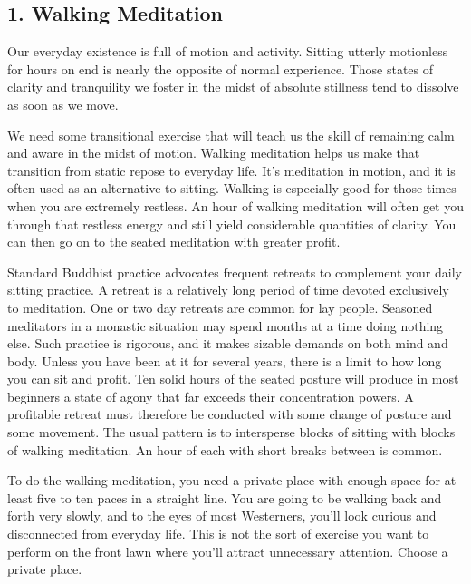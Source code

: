 \subsection*{1. Walking Meditation}

Our everyday existence is full of motion and activity.  Sitting utterly
motionless for hours on end is nearly the opposite of normal experience. Those
states of clarity and tranquility we foster in the midst of absolute stillness
tend to dissolve as soon as we move.

We need some transitional exercise that will teach us the skill of remaining
calm and aware in the midst of motion. Walking meditation helps us make that
transition from static repose to everyday life. It's meditation in motion, and
it is often used as an alternative to sitting. Walking is especially good for
those times when you are extremely restless. An hour of walking meditation will
often get you through that restless energy and still yield considerable
quantities of clarity. You can then go on to the seated meditation with greater
profit.

Standard Buddhist practice advocates frequent retreats to complement your daily
sitting practice. A retreat is a relatively long period of time devoted
exclusively to meditation. One or two day retreats are common for lay people.
Seasoned meditators in a monastic situation may spend months at a time doing
nothing else. Such practice is rigorous, and it makes sizable demands on both
mind and body. Unless you have been at it for several years, there is a limit to
how long you can sit and profit. Ten solid hours of the seated posture will
produce in most beginners a state of agony that far exceeds their concentration
powers. A profitable retreat must therefore be conducted with some change of
posture and some movement. The usual pattern is to intersperse blocks of sitting
with blocks of walking meditation. An hour of each with short breaks between is
common.

To do the walking meditation, you need a private place with enough space for at
least five to ten paces in a straight line. You are going to be walking back and
forth very slowly, and to the eyes of most Westerners, you'll look curious and
disconnected from everyday life. This is not the sort of exercise you want to
perform on the front lawn where you'll attract unnecessary attention.  Choose a
private place.

